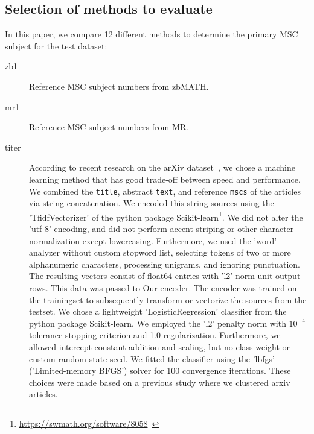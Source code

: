 \subsection{Selection of methods to evaluate}


In this paper, we compare 12 different methods to determine the primary MSC subject for the test dataset:

\begin{description}
    \item[zb1] Reference MSC subject numbers from zbMATH.
  \item[mr1] Reference MSC subject numbers from MR.
  \item[titer] According to recent research on the arXiv dataset~\cite{Scharpf2020}, we chose a machine learning method that has good trade-off between speed and performance. We combined the \texttt{title}, abstract \texttt{text}, and reference \texttt{mscs} of the articles via string concatenation.
  We encoded this string sources using the 'TfidfVectorizer' of the python package Scikit-learn\footnote{\url{https://swmath.org/software/8058}~\cite{swSciKit}}. We did not alter the 'utf-8' encoding, and did not perform accent striping or other character normalization except lowercasing. Furthermore, we used the 'word' analyzer without custom stopword list, selecting tokens of two or more alphanumeric characters, processing unigrams, and ignoring punctuation. The resulting vectors consist of float64 entries with 'l2' norm unit output rows. This data was passed to Our encoder. The encoder was trained on the trainingset to subsequently transform or vectorize the sources from the testset.  We chose a lightweight 'LogisticRegression' classifier from the python package Scikit-learn. We employed the 'l2' penalty norm with $10^{-4}$ tolerance stopping criterion and 1.0 regularization. Furthermore, we allowed intercept constant addition and scaling, but no class weight or custom random state seed. We fitted the classifier using the 'lbfgs' ('Limited-memory BFGS') solver for 100 convergence iterations. These choices were made based on a previous study where we clustered arxiv articles.

\end{description}
